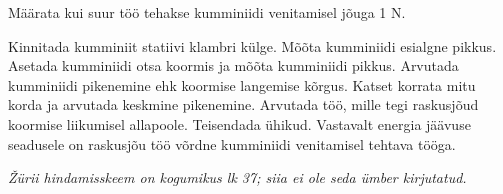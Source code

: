 
Määrata kui suur töö tehakse kumminiidi venitamisel jõuga 1 N.

\hint

\solu
Kinnitada kumminiit statiivi klambri külge. Mõõta kumminiidi esialgne pikkus. Asetada kumminiidi otsa koormis ja mõõta kumminiidi pikkus. Arvutada kumminiidi pikenemine ehk koormise langemise kõrgus. Katset korrata mitu korda ja arvutada keskmine pikenemine. Arvutada töö, mille tegi raskusjõud koormise liikumisel allapoole. Teisendada ühikud. Vastavalt energia jäävuse seadusele on raskusjõu töö võrdne kumminiidi venitamisel tehtava tööga.

\textit{Žürii hindamisskeem on kogumikus lk 37; siia ei ole seda ümber kirjutatud.}
\probend
